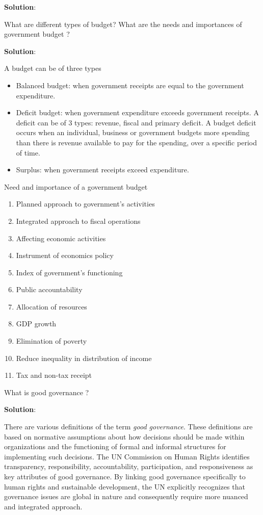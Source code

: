 \documentclass[
  openany]{book}
\newcommand{\question}{\item}
\newenvironment{solution}{ {\bfseries Solution}:}{}
\begin{document}
\begin{questions}
\begin{solution}
\end{solution}

\question What are different types of budget? What are the needs and importances of government budget ?

\begin{solution}

A budget can be of three types
\begin{itemize}
\item Balanced budget: when government receipts are equal to the government expenditure.
\item Deficit budget: when government expenditure exceeds government receipts. A deficit can be of 3 types: revenue, fiscal and primary deficit. A budget deficit occurs when an individual, business or government budgets more spending than there is revenue available to pay for the spending, over a specific period of time.
\item Surplus: when government receipts exceed expenditure.
\end{itemize}

Need and importance of a government budget
\begin{enumerate}
\item Planned approach to government's activities
\item Integrated approach to fiscal operations
\item Affecting economic activities
\item Instrument of economics policy
\item Index of government's functioning
\item Public accountability
\item Allocation of resources
\item GDP growth
\item Elimination of poverty
\item Reduce inequality in distribution of income
\item Tax and non-tax receipt
\end{enumerate}

\end{solution}

\question What is good governance ?

\begin{solution}

There are various definitions of the term \textit{good governance}. These definitions are based on normative assumptions about how decisions should be made within organizations and the functioning of formal and informal structures for implementing such decisions. The UN Commission on Human Rights identifies transparency, responsibility, accountability, participation, and responsiveness as key attributes of good governance. By linking good governance specifically to human rights and sustainable development, the UN explicitly recognizes that governance issues are global in nature and consequently require more nuanced and integrated approach. 


\end{solution}
\end{questions}
\end{document}
